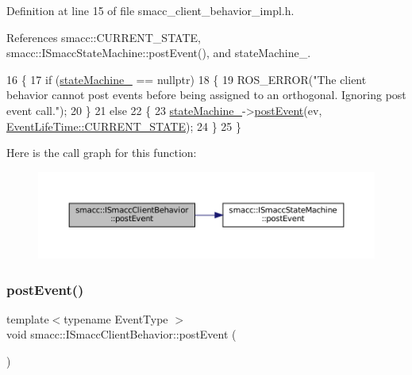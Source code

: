 Definition at line 15 of file smacc\+\_\+client\+\_\+behavior\+\_\+impl.\+h.



References smacc\+::\+C\+U\+R\+R\+E\+N\+T\+\_\+\+S\+T\+A\+TE, smacc\+::\+I\+Smacc\+State\+Machine\+::post\+Event(), and state\+Machine\+\_\+.


\begin{DoxyCode}
16 \{
17     \textcolor{keywordflow}{if} (\hyperlink{classsmacc_1_1ISmaccClientBehavior_a0fea65db292a8bb3dfba3e5840491d79}{stateMachine\_} == \textcolor{keyword}{nullptr})
18     \{
19         ROS\_ERROR(\textcolor{stringliteral}{"The client behavior cannot post events before being assigned to an orthogonal. Ignoring
       post event call."});
20     \}
21     \textcolor{keywordflow}{else}
22     \{
23         \hyperlink{classsmacc_1_1ISmaccClientBehavior_a0fea65db292a8bb3dfba3e5840491d79}{stateMachine\_}->\hyperlink{classsmacc_1_1ISmaccStateMachine_afcb6a216441aeaea2cba4e1ab12c366b}{postEvent}(ev, 
      \hyperlink{namespacesmacc_a5063f47926ad2fe25120ed4b1e7b2c7ea49b599d413671f16f08d0dd18243c294}{EventLifeTime::CURRENT\_STATE});
24     \}
25 \}
\end{DoxyCode}
Here is the call graph for this function\+:
\nopagebreak
\begin{figure}[H]
\begin{center}
\leavevmode
\includegraphics[width=350pt]{classsmacc_1_1ISmaccClientBehavior_af8c7fc75e85d717ecee0dcd254f71681_cgraph}
\end{center}
\end{figure}
\mbox{\label{classsmacc_1_1ISmaccClientBehavior_a5db577c585935114058770f2b7242f8a}} 
\subsubsection{\texorpdfstring{post\+Event()}{postEvent()}\hspace{0.1cm}{\footnotesize\ttfamily [2/2]}}
{\footnotesize\ttfamily template$<$typename Event\+Type $>$ \\
void smacc\+::\+I\+Smacc\+Client\+Behavior\+::post\+Event (\begin{DoxyParamCaption}{ }\end{DoxyParamCaption})\hspace{0.3cm}{\ttfamily [protected]}}



